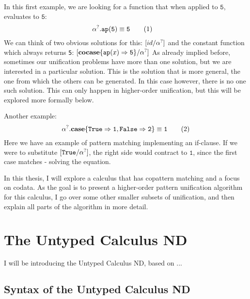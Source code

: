 \documentclass[twoside,12pt,a4paper]{article}
\begin{document}
\begin{example}\label{sec:mgu}
    In this first example, we are looking for a function that when applied to $\mathtt{5}$, evaluates to $\mathtt{5}$:
    \begin{align*}
        &\alpha^?.\texttt{ap}(\mathtt{5}) \equiv \mathtt{5}\tag{1} 
    \end{align*}
    We can think of two obvious solutions for this: $[id / \alpha^?]$ and the constant function which always returns \texttt{5}: $[\textbf{cocase}\{\texttt{ap}(x)\Rightarrow \mathtt{5}\} / \alpha^?]$
    As already implied before, sometimes our unification problems have more than one solution, 
    but we are interested in a particular solution. This is the solution that is more general, the one from which the others can be generated.
    In this case however, there is no one such solution. This can only happen in higher-order unification, but this will be explored more formally below.
    
    Another example:
    \begin{align*}
    \alpha^?.\textbf{case}\{\mathtt{True \Rightarrow 1, False \Rightarrow 2}\}\equiv \mathtt{1} \tag{2}
    \end{align*}
    Here we have an example of pattern matching implementing an if-clause.
    If we were to substitute $[\mathtt{True / \alpha^?}]$, the right side would contract to $\mathtt{1}$,
    since the first case matches - solving the equation.
\end{example}

In this thesis, I will explore a calculus that has copattern matching and a focus on codata.
As the goal is to present a higher-order pattern unification algorithm for this calculus,
I go over some other smaller subsets of unification, and then explain all parts of the algorithm in more detail.

\section{The Untyped Calculus ND}

I will be introducing the Untyped Calculus ND, based on ... %

\subsection{Syntax of the Untyped Calculus ND}\label{sec:syntax}
\end{document}
